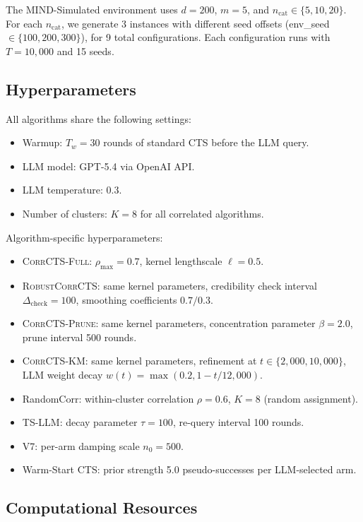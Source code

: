 \documentclass{article}
\theoremstyle{plain}
\theoremstyle{definition}
\theoremstyle{remark}
\newcommand{\CorrFull}{\textsc{CorrCTS-Full}}
\newcommand{\RobustCorr}{\textsc{RobustCorrCTS}}
\newcommand{\EdgePrune}{\textsc{CorrCTS-Prune}}
\newcommand{\KMRefine}{\textsc{CorrCTS-KM}}
\begin{document}
The MIND-Simulated environment uses $d = 200$, $m = 5$, and $n_\text{cat} \in \{5, 10, 20\}$.
For each $n_\text{cat}$, we generate 3 instances with different seed offsets (env\_seed $\in \{100, 200, 300\}$), for 9 total configurations.
Each configuration runs with $T = 10{,}000$ and 15 seeds.

\subsection{Hyperparameters}

All algorithms share the following settings:
\begin{itemize}
\item Warmup: $T_w = 30$ rounds of standard CTS before the LLM query.
\item LLM model: GPT-5.4 via OpenAI API.
\item LLM temperature: 0.3.
\item Number of clusters: $K = 8$ for all correlated algorithms.
\end{itemize}

Algorithm-specific hyperparameters:
\begin{itemize}
\item \CorrFull{}: $\rho_{\max} = 0.7$, kernel lengthscale $\ell = 0.5$.
\item \RobustCorr{}: same kernel parameters, credibility check interval $\Delta_{\text{check}} = 100$, smoothing coefficients $0.7/0.3$.
\item \EdgePrune{}: same kernel parameters, concentration parameter $\beta = 2.0$, prune interval 500 rounds.
\item \KMRefine{}: same kernel parameters, refinement at $t \in \{2{,}000, 10{,}000\}$, LLM weight decay $w(t) = \max(0.2, 1 - t/12{,}000)$.
\item RandomCorr: within-cluster correlation $\rho = 0.6$, $K = 8$ (random assignment).
\item TS-LLM: decay parameter $\tau = 100$, re-query interval 100 rounds.
\item V7: per-arm damping scale $n_0 = 500$.
\item Warm-Start CTS: prior strength 5.0 pseudo-successes per LLM-selected arm.
\end{itemize}

\subsection{Computational Resources}
\end{document}

